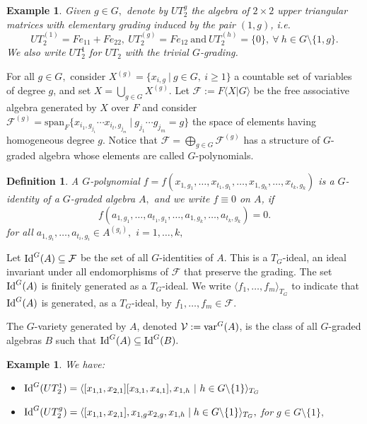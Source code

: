\documentclass{amsart}
\newcommand{\var}{\ensuremath{\textnormal{var}}}
\newcommand{\Idg}{\ensuremath{\textnormal{Id}^{G}}}
\newtheorem{exemplo}[teorema]{Example}
\newtheorem{definicao}[teorema]{Definition}
\numberwithin{equation}{section}
\begin{document}
\begin{exemplo}\label{exemG-grad} Given $g \in G,$ denote by $UT_2^g$ the algebra of $2\times 2$ upper triangular matrices with elementary grading induced
by the pair $(1, g)$, i.e. $$UT_2^{(1)} = Fe_{11}+ Fe_{22}, ~UT_2^{(g)} = Fe_{12} ~\mbox{and}~ UT_2^{(h)} = \{0\}, ~ \forall ~h \in G\setminus \{1,g\}. $$ We also write $UT_2^1$ for $UT_2$ with the trivial $G$-grading.
\end{exemplo}


  For all $g \in G,$ consider $X^{(g)} = \{x_{i,g} ~|~ g \in G, ~ i \ge 1\}$ a countable set of variables of degree $g$, and set $X =\bigcup\limits_{g\in G}X^{(g)}.$ Let $\mathcal{F}:=F \langle X| G \rangle$ be the free associative algebra generated by $X$ over $F$ and consider
$\mathcal{F}^{(g)} = \mbox{span}_F \{x_{i_1,g_{j_1}}
\cdots x_{i_t,g_{j_m}}
~|~ g_{j_1}\cdots g_{j_m} = g\}$ the space of elements having homogeneous
degree $g$.  Notice that $\mathcal{F} =\bigoplus\limits_{g\in G}\mathcal{F}^{(g)}$ has a structure of $G$-graded algebra whose elements are called $G$-polynomials. 

\begin{definicao} A $G$-polynomial $f = f(x_{1,g_1} , \ldots, x_{t_1,g_1} , \ldots, x_{1,g_k} , \ldots, x_{t_k,g_k} )$ is a $G$-identity of a $G$-graded algebra $A,$ and we write $f \equiv 0$ on $A$, if $$f(a_{1,g_1} ,\ldots, a_{t_1,g_1}, \ldots,a_{1,g_k} ,\ldots,a_{t_k,g_k} )=0.$$ for all $a_{1,g_i} , \ldots , a_{t_i,g_i} \in A^{(g_i)},$ $ i = 1,\ldots, k,$

\end{definicao}

Let $\Idg(A)\subseteq \mathcal{F}$ be the set of all $G$-identities of $A.$ This is a $T_{G}$-ideal, an ideal invariant
under all endomorphisms of $\mathcal{F}$ that preserve the grading. The set $\Idg(A)$  is finitely generated as a $T_G$-ideal.  We write
$\langle f_1, \ldots, f_m \rangle_{{T_G}}$ to indicate that  $\Idg(A)$ is generated, as a $T_G$-ideal, by $f_1, \ldots, f_m \in \mathcal{F}.$  

The $G$-variety generated by $A$, denoted $\mathcal{V}:=\var^G(A)$, is the class of all $G$-graded algebras $B$ such that $\Idg(A)\subseteq \Idg(B).$

\begin{exemplo}\cite[{Theorem 2.3}]{GC}
\label{exemidealgrad} 
 We have: 
 \begin{itemize} \item[1)]$\Idg(UT_2^1)=\langle [x_{1,1},x_{2,1}][x_{3,1},x_{4,1}], x_{1,h}~|~h \in G\backslash\{1\}\rangle_{T_G}\,$
 \item[2)]
 $\Idg(UT_2^g) = \langle[x_{1,1}, x_{2,1}], x_{1,g}x_{2,g}, x_{1,h}\mid h\in G\backslash \{1\}\rangle_{T_G}, $  for $g\in G\setminus \{1\},$ 
  
\end{itemize}
    
\end{exemplo}
\end{document}

